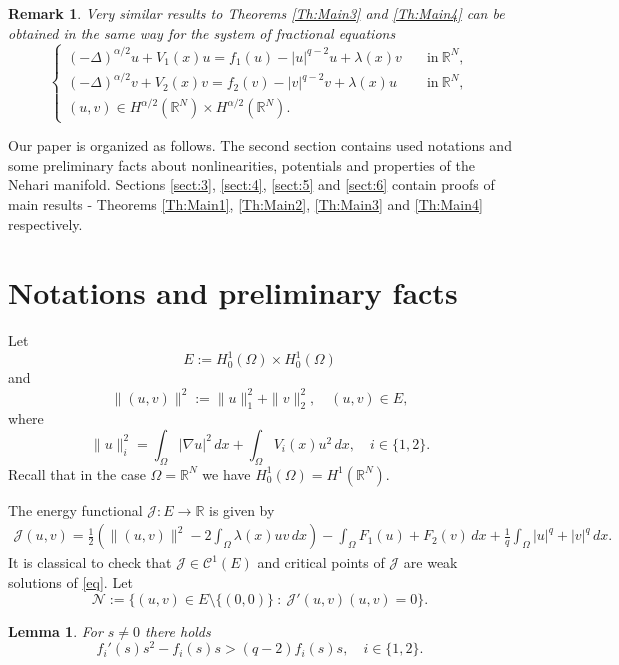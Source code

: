 \documentclass{scrartcl}
\newtheorem{Lem}[Th]{Lemma}
\newtheorem{Rem}[Th]{Remark}
\newcommand{\cC}{{\mathcal C}}
\newcommand{\cJ}{{\mathcal J}}
\newcommand{\cN}{{\mathcal N}}
\newcommand{\R}{\mathbb{R}}
\numberwithin{equation}{section}
\begin{document}
\begin{Rem}
Very similar results to Theorems \ref{Th:Main3} and \ref{Th:Main4} can be obtained in the same way for the system of fractional equations
$$
\left\{ \begin{array}{ll}
(-\Delta)^{\alpha / 2} u + V_1 (x) u = f_1 (u) - |u|^{q-2}u + \lambda(x)v & \quad \mbox{in} \ \R^N, \\
(-\Delta)^{\alpha / 2} v + V_2 (x) v = f_2 (v) - |v|^{q-2}v + \lambda(x)u & \quad \mbox{in} \ \R^N, \\
(u,v) \in H^{\alpha / 2} (\R^N) \times H^{\alpha / 2} (\R^N). & 
\end{array} \right.
$$
\end{Rem}

Our paper is organized as follows. The second section contains used notations and some preliminary facts about nonlinearities, potentials and properties of the Nehari manifold. Sections \ref{sect:3}, \ref{sect:4}, \ref{sect:5} and \ref{sect:6} contain proofs of main results - Theorems \ref{Th:Main1}, \ref{Th:Main2}, \ref{Th:Main3} and \ref{Th:Main4} respectively.

\section{Notations and preliminary facts}\label{sect:2}

Let
$$
E := H^1_0 (\Omega) \times H^1_0 (\Omega)
$$
and
$$
\| (u,v) \|^2 := \| u \|_1^2 + \|v\|_2^2, \quad (u,v) \in E,
$$
where
$$
\|u\|_i^2 = \int_{\Omega} | \nabla u|^2 \, dx + \int_{\Omega} V_i(x) u^2 \, dx, \quad i \in \{1,2\}.
$$
Recall that in the case $\Omega = \R^N$ we have $H_0^1 (\Omega) = H^1 (\R^N)$.

The energy functional $\cJ : E \rightarrow \R$ is given by
\begin{align}\label{J}
\cJ(u,v) = \frac{1}{2} \left( \| (u,v) \|^2 - 2 \int_{\Omega} \lambda(x) uv \, dx \right) - \int_{\Omega} F_1 (u) + F_2 (v) \, dx + \frac{1}{q} \int_{\Omega} |u|^q + |v|^q \, dx.
\end{align}
It is classical to check that $\cJ \in \cC^1 (E)$ and critical points of $\cJ$ are weak solutions of \eqref{eq}.
Let
$$
\cN := \{ (u,v) \in E \setminus \{(0,0)\} \ : \ \cJ'(u,v) (u,v) = 0 \}.
$$

\begin{Lem}
For $s \neq 0$ there holds
\begin{equation}\label{1.1}
f_i'(s)s^2 - f_i(s)s > (q-2) f_i(s)s, \quad i \in \{1,2\}.
\end{equation}
\end{Lem}
\end{document}
